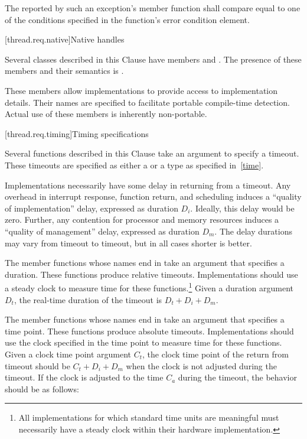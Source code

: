 \pnum
The  reported by such an exception's  member function
shall compare equal to one of the conditions specified in the function's error condition
element.

[thread.req.native]{Native handles}

\pnum
Several classes described in this Clause have members  and
. The presence of these members and their semantics is
.
\begin{note} These members allow implementations to provide access
to implementation details. Their names are specified to facilitate portable compile-time
detection. Actual use of these members is inherently non-portable. \end{note}

[thread.req.timing]{Timing specifications}

\pnum
Several functions described in this Clause take an argument to specify a timeout. These
timeouts are specified as either a  or a  type as
specified in~\ref{time}.

\pnum
Implementations necessarily have some delay in returning from a timeout. Any overhead in
interrupt response, function return, and scheduling induces a ``quality of implementation''
delay, expressed as duration $D_i$. Ideally, this delay would be zero. Further, any contention for
processor and memory resources induces a ``quality of management'' delay, expressed as duration
$D_m$. The delay durations may vary from timeout to timeout, but in all cases shorter is better.

\pnum
The member functions whose names end in  take an argument that
specifies a duration. These functions produce relative timeouts. Implementations
should use a steady clock to measure time for these functions.\footnote{All
implementations for which standard time units are meaningful must necessarily
have a steady clock within their hardware implementation.} Given a duration
argument $D_t$, the real-time duration of the timeout is $D_t + D_i + D_m$.

\pnum
The member functions whose names end in  take an argument that specifies a time
point. These functions produce absolute timeouts. Implementations should use the clock
specified in the time point to measure time for these functions. Given a clock time point
argument $C_t$, the clock time point of the return from timeout should be $C_t + D_i + D_m$
when the clock is not adjusted during the timeout. If the clock is adjusted to the time $C_a$
during the timeout, the behavior should be as follows:

